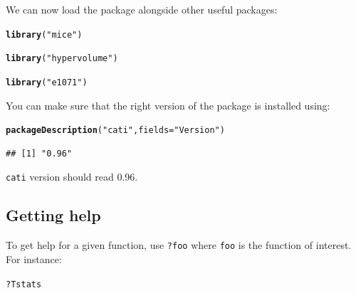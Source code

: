\documentclass[12pt]{article}\usepackage[]{graphicx}\usepackage[]{color}
\makeatletter
\newcommand{\hlstr}[1]{\textcolor[rgb]{0.192,0.494,0.8}{#1}}%
\newcommand{\hlopt}[1]{\textcolor[rgb]{0,0,0}{#1}}%
\newcommand{\hlstd}[1]{\textcolor[rgb]{0.345,0.345,0.345}{#1}}%
\newcommand{\hlkwc}[1]{\textcolor[rgb]{0.333,0.667,0.333}{#1}}%
\newcommand{\hlkwd}[1]{\textcolor[rgb]{0.737,0.353,0.396}{\textbf{#1}}}%
\newenvironment{kframe}{%
 \def\at@end@of@kframe{}%
 \ifinner\ifhmode%
  \def\at@end@of@kframe{\end{minipage}}%
  \begin{minipage}{\columnwidth}%
 \fi\fi%
 \def\FrameCommand##1{\hskip\@totalleftmargin \hskip-\fboxsep
 \colorbox{shadecolor}{##1}\hskip-\fboxsep
     \hskip-\linewidth \hskip-\@totalleftmargin \hskip\columnwidth}%
 \MakeFramed {\advance\hsize-\width
   \@totalleftmargin\z@ \linewidth\hsize
   \@setminipage}}%
 {\par\unskip\endMakeFramed%
 \at@end@of@kframe}
\newenvironment{knitrout}{}{} %
\makeatother
\begin{document}
We can now load the package alongside other useful packages:
\begin{knitrout}
\color{fgcolor}\begin{kframe}
\begin{alltt}
\hlkwd{library}\hlstd{(}\hlstr{"mice"}\hlstd{)}
\end{alltt}


{\ttfamily\noindent\itshape\color{messagecolor}{\#\# Loading required package: Rcpp\\\#\# Loading required package: lattice\\\#\# mice 2.22 2014-06-10}}\begin{alltt}
\hlkwd{library}\hlstd{(}\hlstr{"hypervolume"}\hlstd{)}
\end{alltt}


{\ttfamily\noindent\itshape\color{messagecolor}{\#\# Loading required package: rgl}}\begin{alltt}
\hlkwd{library}\hlstd{(}\hlstr{"e1071"}\hlstd{)}
\end{alltt}
\end{kframe}
\end{knitrout}

You can make sure that the right version of the package is installed using:
\begin{knitrout}
\color{fgcolor}\begin{kframe}
\begin{alltt}
\hlkwd{packageDescription}\hlstd{(}\hlstr{"cati"}\hlstd{,} \hlkwc{fields} \hlstd{=} \hlstr{"Version"}\hlstd{)}
\end{alltt}
\begin{verbatim}
## [1] "0.96"
\end{verbatim}
\end{kframe}
\end{knitrout}
\texttt{cati} version should read 0.96.

\subsection{Getting help}

To get help for a given function, use \texttt{?foo} where \texttt{foo} is the
function of interest.
For instance:

\begin{knitrout}
\color{fgcolor}\begin{kframe}
\begin{alltt}
\hlopt{?}\hlstd{Tstats}
\end{alltt}
\end{kframe}
\end{knitrout}
\end{document}
